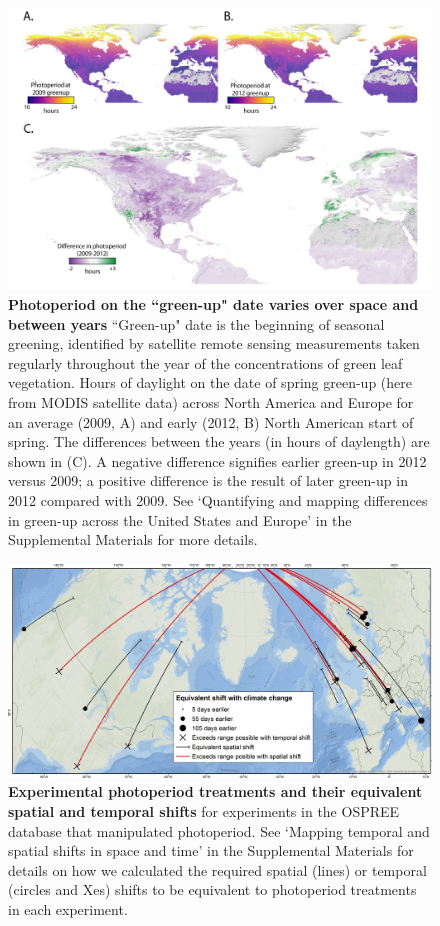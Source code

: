 \documentclass{article}
\begin{document}
 \begin{figure}[p]
\centering
\includegraphics{..//..//docs/photoperiod/figures/Greenup_corr_sm_leg.pdf} %
\caption{\textbf{Photoperiod on the ``green-up" date varies over space and between years} ``Green-up" date is the beginning of seasonal greening, identified by satellite remote sensing measurements taken regularly throughout the year of the concentrations of green leaf vegetation. Hours of daylight on the date of spring green-up (here from MODIS satellite data) across North America and Europe for an average (2009, A) and  early (2012, B) North American start of spring. The differences between the years (in hours of daylength) are shown in (C). A negative difference signifies earlier green-up in 2012 versus 2009; a positive difference is the result of later green-up in 2012 compared with 2009. See `Quantifying and mapping differences in green-up across the United States and Europe' in the Supplemental Materials for more details. }%
 \label{fig:greenup}%
 \end{figure}

\begin{figure}[p]
\centering
\includegraphics{..//..//analyses/photoperiod/figures/ospree_photopmap_fromblake.jpg} 
\caption{\textbf{Experimental photoperiod treatments and their equivalent spatial and temporal shifts} for experiments in the OSPREE database that manipulated photoperiod. See `Mapping temporal and spatial shifts in space and time' in the Supplemental Materials for details on how we calculated the required spatial (lines) or temporal (circles and Xes) shifts to be equivalent to photoperiod treatments in each experiment.}
 \label{fig:photomap}
 \end{figure}
\end{document}
